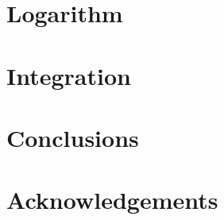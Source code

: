 \documentclass[epsfig,12pt]{article}
\begin{document}
\section{Logarithm}
\label{section-dirac}
\setcounter{equation}{0}


\newpage
\section{Integration}
\label{section-dirac}
\setcounter{equation}{0}


\section{Conclusions}


\section*{Acknowledgements}
\end{document}
